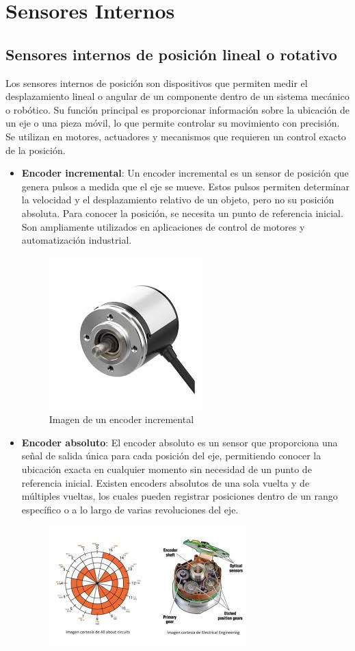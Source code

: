 \section{Sensores Internos}
\subsection{Sensores internos de posición lineal o rotativo}
Los sensores internos de posición son dispositivos que permiten medir el desplazamiento lineal o angular de un componente dentro de un sistema mecánico o robótico. Su función principal es proporcionar información sobre la ubicación de un eje o una pieza móvil, lo que permite controlar su movimiento con precisión. Se utilizan en motores, actuadores y mecanismos que requieren un control exacto de la posición.

\begin{itemize}
\item \textbf{Encoder incremental}: Un encoder incremental es un sensor de posición que genera pulsos a medida que el eje se mueve. Estos pulsos permiten determinar la velocidad y el desplazamiento relativo de un objeto, pero no su posición absoluta. Para conocer la posición, se necesita un punto de referencia inicial. Son ampliamente utilizados en aplicaciones de control de motores y automatización industrial.
\begin{figure}[h]
	\centering
	\includegraphics[width=4 cm]{img/EncoderIn}
	\caption{Imagen de un encoder incremental}
	\label{fig:EncoderIn}
\end{figure}
\item \textbf{Encoder absoluto}: El encoder absoluto es un sensor que proporciona una señal de salida única para cada posición del eje, permitiendo conocer la ubicación exacta en cualquier momento sin necesidad de un punto de referencia inicial. Existen encoders absolutos de una sola vuelta y de múltiples vueltas, los cuales pueden registrar posiciones dentro de un rango específico o a lo largo de varias revoluciones del eje.
\begin{figure}[h]
	\centering
	\includegraphics[width=10 cm]{img/EncoderAb}

\end{figure}
\end{itemize}
